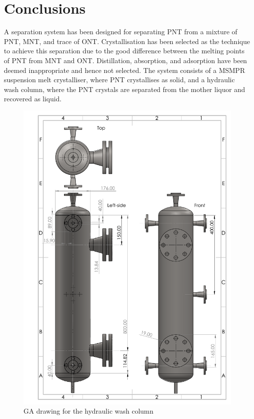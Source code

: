 \section{Conclusions}\label{separation conclusions}

A separation system has been designed for separating PNT from a mixture of PNT, MNT, and trace of ONT. Crystallisation has been selected as the technique to achieve this separation due to the good difference between the melting points of PNT from MNT and ONT. Distillation, absorption, and adsorption have been deemed inappropriate and hence not selected. The system consists of a MSMPR suspension melt crystalliser, where PNT crystallises as solid, and a hydraulic wash column, where the PNT crystals are separated from the mother liquor and recovered as liquid. 

\begin{figure}
    \centering
    \includegraphics[scale=0.3]{chapters/3-separation/figures/Hydraulic_Wash_Column_GA.PDF}
    \caption{GA drawing for the hydraulic wash column}
    \label{fig:wash column GA}
\end{figure} 

